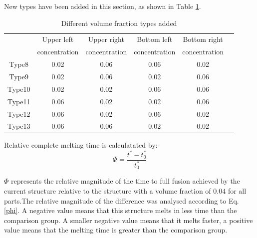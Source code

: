 \documentclass[preprint,12pt]{elsarticle}
\begin{document}
New types have been added in this section, as shown in Table \ref{type2}.
\begin{table}[H]
	\centering
	\footnotesize
	\caption{Different volume fraction types added}
	\begin{tabular}{cccccc}
		\toprule
		& Upper left  & Upper right  & Bottom left  & Bottom right  \\
		& concentration  & concentration  & concentration  & concentration  \\
		\midrule
		Type8  & 0.02 & 0.06  & 0.06   & 0.02   \\
		Type9  & 0.02 & 0.06  & 0.02   & 0.06   \\
		Type10 & 0.02 & 0.02  & 0.06   & 0.06   \\
		Type11 & 0.06 & 0.02  & 0.02   & 0.06   \\
		Type12 & 0.06 & 0.02  & 0.06   & 0.02   \\
		Type13 & 0.06 & 0.06  & 0.02   & 0.02   \\
		\bottomrule
	\end{tabular}
	\label{type2}		
\end{table}

Relative complete melting time is calculatated by:
\begin{equation}
	\Phi=\frac{t^*-t^*_0}{t^*_0}	
	\label{phi}
\end{equation}

$ \Phi $ represents the relative magnitude of the time to full fusion achieved by the current structure relative to the structure with a volume fraction of $ 0.04 $ for all parts.The relative magnitude of the difference was analysed according to Eq. \ref{phi}.  A negative value means that this structure melts in less time than the comparison group. A smaller negative value means that it melts faster, a positive value means that the melting time is greater than the comparison group.
\end{document}
